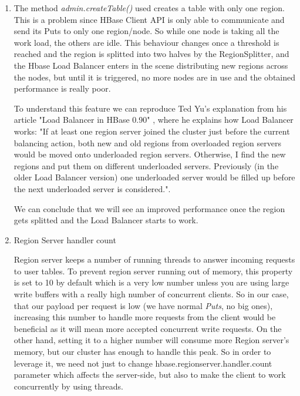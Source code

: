 \begin{enumerate}
\item The method \textit{admin.createTable()} used creates a table with only one region. This is a problem since HBase Client API is only able to communicate and send its Puts to only one region/node. So while one node is taking all the work load, the others are idle. This behaviour changes once a threshold is reached and the region is splitted into two halves by the RegionSplitter, and the Hbase Load Balancer enters in the scene distributing new regions across the nodes, but until it is triggered, no more nodes are in use and the obtained performance is really poor.
\par

To understand this feature we can reproduce Ted Yu's explanation from his article "Load Balancer in HBase 0.90" \cite{LoadBalancer}, where he explains how Load Balancer works: "If at least one region server joined the cluster just before the current balancing action, both new and old regions from overloaded region servers would be moved onto underloaded region servers. Otherwise, I find the new regions and put them on different underloaded servers. Previously (in the older Load Balancer version) one underloaded server would be filled up before the next underloaded server is considered.".
\par
We can conclude that we will see an improved performance once the region gets splitted and the Load Balancer starts to work.




\item Region Server handler count

Region server keeps a number of running threads to answer incoming requests to user tables. To prevent region server running out of memory, this property is set to 10 by default which is a very low number unless you are using large write buffers with a really high number of concurrent clients. So in our case, that our payload per request is low (we have normal \textit{Puts}, no big ones), increasing this number to handle more requests from the client would be beneficial as it will mean more accepted concurrent write requests. On the other hand, setting it to a higher number will consume more Region server's memory, but our cluster has enough to handle this peak. So in order to leverage it, we need not just to change hbase.regionserver.handler.count parameter which affects the server-side, but also to make the client to work concurrently by using threads.


\end{enumerate}
